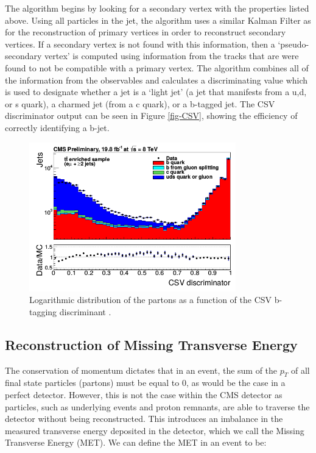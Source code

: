 The algorithm begins by looking for a secondary vertex with the properties listed above. Using all particles in the jet, the algorithm uses a similar Kalman Filter \cite{VertexFitting} as for the reconstruction of primary vertices in order to reconstruct secondary vertices. If a secondary vertex is not found with this information, then a `pseudo-secondary vertex' is computed using information from the tracks that are were found to not be compatible with a primary vertex. The algorithm combines all of the information from the observables and calculates a discriminating value which is used to designate whether a jet is a `light jet' (a jet that manifests from a u,d, or s quark), a charmed jet (from a c quark), or a b-tagged jet. The CSV discriminator output can be seen in Figure \ref{fig-CSV}, showing the efficiency of correctly identifying a b-jet.

\begin{figure}
\begin{center}
\includegraphics[width=0.8\textwidth]{Figures/CSVDiscriminator.png}
\end{center}
\caption{Logarithmic distribution of the partons as a function of the CSV b-tagging discriminant \cite{PhilThesis}.}
 \label{fig-CSVDiscriminator}
\end{figure}


\subsection{Reconstruction of Missing Transverse Energy} \label{subsec-METReco}

The conservation of momentum dictates that in an event, the sum of the $p_T$ of all final state particles (partons) must be equal to 0, as would be the case in a perfect detector. However, this is not the case within the CMS detector as particles, such as underlying events and proton remnants, are able to traverse the detector without being reconstructed. This introduces an imbalance in the measured transverse energy deposited in the detector, which we call the Missing Transverse Energy (MET). We can define the MET in an event to be:


